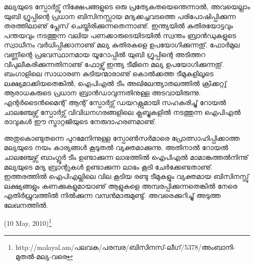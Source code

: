 മല്യയുടെ സ്പോര്‍ട്സു് നിക്ഷേപങ്ങളുടെ ഒരു പ്രത്യേകതയെന്തെന്നാല്‍, അവയെല്ലാം യുബി ഗ്രൂപ്പിന്റെ പ്രധാന ബിസിനസ്സായ 
മദ്യക്കച്ചവടത്തെ പരിപോഷിപ്പിക്കുന്ന തരത്തിലാണു് പ്ലേസ് ചെയ്തിരിക്കുന്നതെന്നാണു്. ഇന്ത്യയില്‍ കുതിരയോട്ടവും പന്തയവും 
നടത്തുന്ന വലിയ പണക്കാരുടെയിടയില്‍ സ്വന്തം ബ്രാന്‍ഡുകളുടെ സ്വാധീനം വര്‍ധിപ്പിക്കാനാണു് മല്യ കുതിരകളെ 
ഉപയോഗിക്കുന്നതു്. ഫോര്‍മുല വണ്ണിന്റെ പ്രഭവസ്ഥാനമായ യൂറോപ്പില്‍ യുബി ഗ്രൂപ്പിന്റെ അടിത്തറ വിപുലീകരിക്കുന്നതിനാണു് 
ഫോഴ്സു് ഇന്ത്യ ടീമിനെ മല്യ ഉപയോഗിക്കുന്നതു്. ബംഗാളിലെ സാധാരണ കുടിയന്മാരാണു് കൊല്‍ക്കത്ത ടീമുകളിലൂടെ 
ലക്ഷ്യമാക്കിയതെങ്കില്‍, ഐപിഎല്‍ ടീം അഖിലേന്ത്യാതലത്തില്‍ ക്രിക്കറ്റു് ആരാധകരുടെ പ്രധാന ബ്രാന്‍ഡാവുന്നതിനുള്ള 
അടവായിരുന്നു. എന്റര്‍ടൈന്‍മൈന്റ് ആന്റ് സ്പോര്‍ട്സ് ഡയറക്റ്റുമായി സഹകരിച്ചു് റോയല്‍ ചാലഞ്ചേഴ്സ് സ്പോര്‍ട്സ് 
വിവിധനഗരങ്ങളിലെ ക്ലബ്ബുകളില്‍ നടത്തുന്ന ഐപിഎല്‍ രാവുകള്‍ ഈ സ്ട്രാറ്റജിയുടെ നേരുദാഹരണമാണു്.

അതുകൊണ്ടുതന്നെ പുറമേനിന്നുള്ള സ്പോണ്‍സര്‍മാരെ പ്രോത്സാഹിപ്പിക്കാത്ത മല്യയുടെ നയം കാര്യങ്ങള്‍ കൂടുതല്‍ 
വ്യക്തമാക്കുന്നു. അതിനാല്‍ റോയല്‍ ചാലഞ്ചേഴ്സ് ബാംഗ്ലൂര്‍ ടീം ഉണ്ടാക്കുന്ന ലാഭത്തില്‍ ഐപിഎല്‍ മാമാങ്കത്തല്‍നിന്നു് 
മല്യയുടെ മദ്യ ബ്രാന്റുകള്‍ ഉണ്ടാക്കുന്ന ലാഭം കൂടി ചേര്‍ക്കേണ്ടതാണു്. ഇത്തരത്തില്‍ ഐപിഎല്ലിലെ വില കൂടിയ 
രണ്ടു ടീമുകളും വ്യക്തമായ ബിസിനസ്സു് ലക്ഷ്യങ്ങളും കണക്കുകളുമായാണു് ആളുകളെ അമ്പരപ്പിക്കുന്നതെങ്കില്‍ നേരെ 
എതിര്‍ധ്രുവത്തില്‍ നില്‍ക്കുന്ന വമ്പന്‍മാരുമുണ്ടു്. അവരെക്കുറിച്ചു് അടുത്ത ലേഖനത്തില്‍.

\begin{flushright}(10 May, 2010)\footnote{http://malayal.am/പലവക/പരമ്പര/ബിസിനസ്-ലീഗ്/5378/അംബാനി-മുതല്‍-മല്യ-വരെ}\end{flushright}

\newpage
